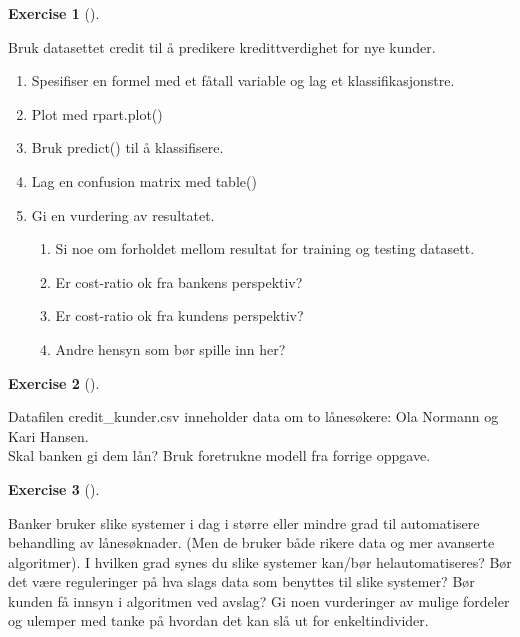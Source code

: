 \documentclass[
  letterpaper,
  DIV=11,
  numbers=noendperiod]{scrreprt}
\providecommand{\tightlist}{%
  \setlength{\itemsep}{0pt}\setlength{\parskip}{0pt}}\usepackage{longtable,booktabs,array}
\theoremstyle{definition}
\newtheorem{exercise}{Exercise}[chapter]
\theoremstyle{remark}
\begin{document}
\leavevmode{}%
\begin{exercise}[]\label{exr-}

Bruk datasettet credit til å predikere kredittverdighet for nye kunder.

\begin{enumerate}
\def\labelenumi{\alph{enumi})}
\tightlist
\item
  Spesifiser en formel med et fåtall variable og lag et
  klassifikasjonstre.
\item
  Plot med rpart.plot()
\item
  Bruk predict() til å klassifisere.
\item
  Lag en confusion matrix med table()
\item
  Gi en vurdering av resultatet.

  \begin{enumerate}
  \def\labelenumii{\arabic{enumii})}
  \tightlist
  \item
    Si noe om forholdet mellom resultat for training og testing
    datasett.
  \item
    Er cost-ratio ok fra bankens perspektiv?
  \item
    Er cost-ratio ok fra kundens perspektiv?
  \item
    Andre hensyn som bør spille inn her?
  \end{enumerate}
\end{enumerate}

\end{exercise}

\leavevmode{}%
\begin{exercise}[]\label{exr-}

Datafilen credit\_kunder.csv inneholder data om to lånesøkere: Ola
Normann og Kari Hansen.\\
Skal banken gi dem lån? Bruk foretrukne modell fra forrige oppgave.

\end{exercise}

\leavevmode{}%
\begin{exercise}[]\label{exr-}

Banker bruker slike systemer i dag i større eller mindre grad til
automatisere behandling av lånesøknader. (Men de bruker både rikere data
og mer avanserte algoritmer). I hvilken grad synes du slike systemer
kan/bør helautomatiseres? Bør det være reguleringer på hva slags data
som benyttes til slike systemer? Bør kunden få innsyn i algoritmen ved
avslag? Gi noen vurderinger av mulige fordeler og ulemper med tanke på
hvordan det kan slå ut for enkeltindivider.

\end{exercise}
\end{document}
